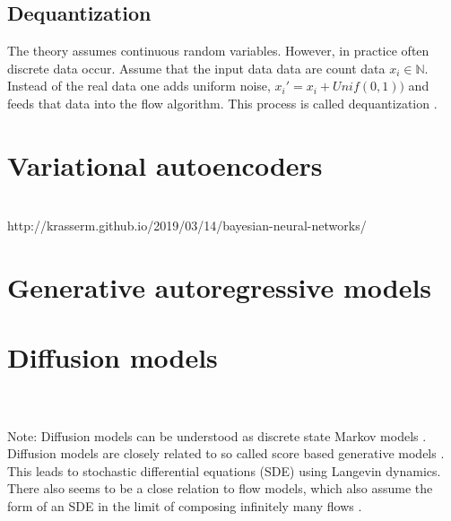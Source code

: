 \documentclass[12pt,a4paper]{article}
\begin{document}
\subsection{Dequantization}
The theory assumes continuous random variables. However, in practice often discrete data occur. Assume that the input data data are count data $x_i \in \mathbb{N}$. Instead of the real data one adds uniform noise, $x_i' =  x_i + Unif(0, 1))$ and feeds that data into the flow algorithm. This process is called dequantization \cite{theis_2015_dequant, ho_2019_flow_pp}.

\section{Variational autoencoders}

\cite{Kingma_2019_AnIntroductionToVariationalAutoencoders}\\
http://krasserm.github.io/2019/03/14/bayesian-neural-networks/
\section{Generative autoregressive models}
\section{Diffusion models}
\cite{weng2021diffusion, dickstein_2015_diffusion, ho_2020_diffusion, rombach_2021_diffusion} \\
\\
Note: Diffusion models can be understood as discrete state Markov models \cite{barber}.
Diffusion models are closely related to so called score based generative models \cite{song_2020_score_sdg,  song_2021_blog_score}.
This leads to stochastic differential equations (SDE) \cite{oksendal_1992_sde} using Langevin dynamics. There also seems to be a close relation to flow models, which also assume the form of an SDE in the limit of composing infinitely many flows  \cite{normalizing_flow_review_kobyzev_2021}.
\end{document}
